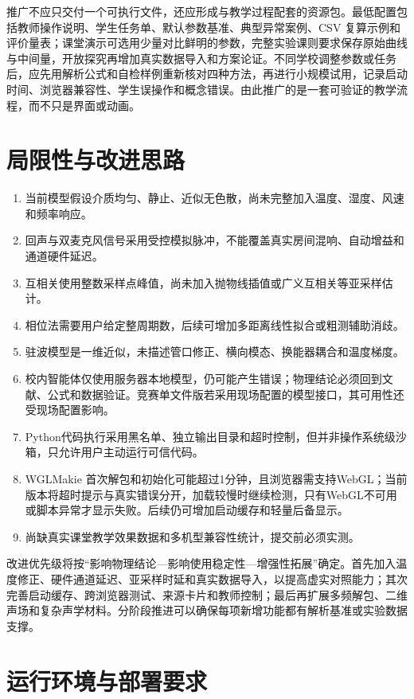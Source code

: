 \documentclass[UTF8,a4paper,zihao=-4]{ctexart}
\begin{document}
推广不应只交付一个可执行文件，还应形成与教学过程配套的资源包。最低配置包括教师操作说明、学生任务单、默认参数基准、典型异常案例、CSV 复算示例和评价量表；课堂演示可选用少量对比鲜明的参数，完整实验课则要求保存原始曲线与中间量，开放探究再增加真实数据导入和方案论证。不同学校调整参数或任务后，应先用解析公式和自检样例重新核对四种方法，再进行小规模试用，记录启动时间、浏览器兼容性、学生误操作和概念错误。由此推广的是一套可验证的教学流程，而不只是界面或动画。

\section{局限性与改进思路}

\begin{enumerate}
  \item 当前模型假设介质均匀、静止、近似无色散，尚未完整加入温度、湿度、风速和频率响应。
  \item 回声与双麦克风信号采用受控模拟脉冲，不能覆盖真实房间混响、自动增益和通道硬件延迟。
  \item 互相关使用整数采样点峰值，尚未加入抛物线插值或广义互相关等亚采样估计。
  \item 相位法需要用户给定整周期数，后续可增加多距离线性拟合或粗测辅助消歧。
  \item 驻波模型是一维近似，未描述管口修正、横向模态、换能器耦合和温度梯度。
  \item 校内智能体仅使用服务器本地模型，仍可能产生错误；物理结论必须回到文献、公式和数据验证。竞赛单文件版若采用现场配置的模型接口，其可用性还受现场配置影响。
  \item Python代码执行采用黑名单、独立输出目录和超时控制，但并非操作系统级沙箱，只允许用户主动运行可信代码。
  \item WGLMakie 首次解包和初始化可能超过1分钟，且浏览器需支持WebGL；当前版本将超时提示与真实错误分开，加载较慢时继续检测，只有WebGL不可用或脚本异常才显示失败。后续仍可增加启动缓存和轻量后备显示。
  \item 尚缺真实课堂教学效果数据和多机型兼容性统计，提交前必须实测。
\end{enumerate}

改进优先级将按“影响物理结论—影响使用稳定性—增强性拓展”确定。首先加入温度修正、硬件通道延迟、亚采样时延和真实数据导入，以提高虚实对照能力；其次完善启动缓存、跨浏览器测试、来源卡片和教师控制；最后再扩展多频解包、二维声场和复杂声学材料。分阶段推进可以确保每项新增功能都有解析基准或实验数据支撑。

\section{运行环境与部署要求}
\end{document}
